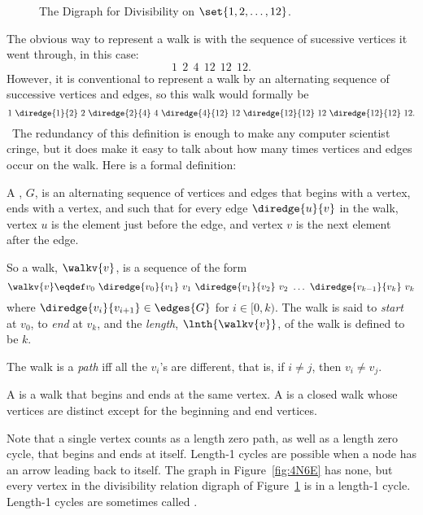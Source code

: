 \begin{figure}
\caption{The Digraph for Divisibility on $\set{1,2,\dots,12}$.}
\label{fig:divisibility-digraph}
\end{figure}

The obvious way to represent a walk is with the sequence of sucessive
vertices it went through, in this case:
\[
1\ \:2\ \:4\ \:12\ \:12\ \:12.
\]
However, it is conventional to represent a walk by an alternating
sequence of successive vertices and edges, so this walk would formally
be
\begin{equation}\label{walk12412}
1\ \diredge{1}{2}\  2\  \diredge{2}{4}\  4\ \diredge{4}{12}\  12\ 
\diredge{12}{12}\  12\ \diredge{12}{12}\  12.
\end{equation}\
The redundancy of this definition is enough to make any computer
scientist cringe, but it does make it easy to talk about how many
times vertices and edges occur on the walk.  Here is a formal
definition:

\begin{definition}\label{def:digraph-walks}
A , $G$, is an alternating sequence of
vertices and edges that begins with a vertex, ends with a vertex, and
such that for every edge $\diredge{u}{v}$ in the walk, vertex $u$ is
the element just before the edge, and vertex $v$ is the next element
after the edge.

So a walk, $\walkv{v}$, is a sequence of the form
\[
\walkv{v} \eqdef v_0\ \diredge{v_0}{v_1}\
v_1\  \diredge{v_1}{v_2}\  v_2\  \dots\  \diredge{v_{k-1}}{v_k}\  v_k
\]
where $\diredge{v_i}{v_{i+1}} \in \edges{G}$ for $i \in [0,k)$.
  The walk is said to \emph{start} at $v_0$, to \emph{end} at $v_k$,
  and the \emph{length}, $\lnth{\walkv{v}}$, of the walk is defined to be
  $k$. 

 The walk is a \emph{path} iff all the $v_i$'s are different, that is,
 if $i \neq j$, then $v_i \neq v_j$.

A \term{closed walk} is a walk that begins and ends at the same
vertex.  A \term{cycle} is a closed walk whose vertices are distinct
except for the beginning and end vertices.
\end{definition}
Note that a single vertex counts as a length zero path, as well as a
length zero cycle, that begins and ends at itself.  Length-1 cycles
are possible when a node has an arrow leading back to itself.  The
graph in Figure~\ref{fig:4N6E} has none, but every vertex in the
divisibility relation digraph of Figure~\ref{fig:divisibility-digraph}
is in a length-1 cycle.  Length-1 cycles are sometimes called
\term{self-loops}.

